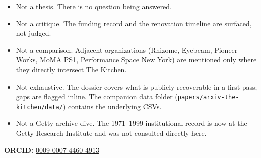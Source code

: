 \documentclass[10pt,letterpaper,twocolumn]{article}
\begin{document}
\begin{itemize}
  \item Not a thesis. There is no question being answered.
  \item Not a critique. The funding record and the renovation timeline are surfaced, not judged.
  \item Not a comparison. Adjacent organizations (Rhizome, Eyebeam, Pioneer Works, MoMA PS1, Performance Space New York) are mentioned only where they directly intersect The Kitchen.
  \item Not exhaustive. The dossier covers what is publicly recoverable in a first pass; gaps are flagged inline. The companion data folder (\texttt{papers/arxiv-the-kitchen/data/}) contains the underlying CSVs.
  \item Not a Getty-archive dive. The 1971--1999 institutional record is now at the Getty Research Institute and was not consulted directly here.
\end{itemize}

\vspace{0.5em}
\noindent\textbf{ORCID:} \href{https://orcid.org/0009-0007-4460-4913}{0009-0007-4460-4913}



\end{document}
